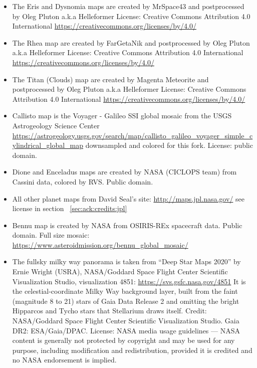 \begin{itemize}
	 Snowfall and postprocessed by Oleg Pluton a.k.a Helleformer
	 License: Creative Commons Attribution 4.0 International \url{https://creativecommons.org/licenses/by/4.0/}
\item The Eris and Dysnomia maps are created by MrSpace43 and postprocessed by 
	 Oleg Pluton a.k.a Helleformer
	 License: Creative Commons Attribution 4.0 International \url{https://creativecommons.org/licenses/by/4.0/}
\item The Rhea map are created by FarGetaNik and postprocessed by Oleg Pluton 
	 a.k.a Helleformer
	 License: Creative Commons Attribution 4.0 International \url{https://creativecommons.org/licenses/by/4.0/}
\item The Titan (Clouds) map are created by Magenta Meteorite and postprocessed
	 by Oleg Pluton a.k.a Helleformer
	 License: Creative Commons Attribution 4.0 International \url{https://creativecommons.org/licenses/by/4.0/}
\item Callisto map is the Voyager - Galileo SSI global mosaic from the USGS
	 Astrogeology Science Center
	 \url{https://astrogeology.usgs.gov/search/map/callisto_galileo_voyager_simple_cylindrical_global_map}
	 downsampled and colored for this fork. License: public domain.
\item Dione and Enceladus maps are created by NASA (CICLOPS team) 
	 from Cassini data, colored by RVS. Public domain.
\item All other planet maps from David Seal's site:
	 \url{http://maps.jpl.nasa.gov/} see license in section ~\ref{sec:ack:credits:jpl}
\item Bennu map is created by NASA from OSIRIS-REx spacecraft data. Public domain.
	 Full size mosaic: \url{https://www.asteroidmission.org/bennu_global_mosaic/}
\item The fullsky milky way panorama is taken from ``Deep Star Maps 2020''
	 by Ernie Wright (USRA), NASA/Goddard Space Flight Center Scientific
	 Visualization Studio, visualization 4851:
	 \url{https://svs.gsfc.nasa.gov/4851}
	 It is the celestial-coordinate Milky Way background layer, built from
	 the faint (magnitude 8 to 21) stars of Gaia Data Release 2 and omitting
	 the bright Hipparcos and Tycho stars that Stellarium draws itself.
	 Credit: NASA/Goddard Space Flight Center Scientific Visualization
	 Studio. Gaia DR2: ESA/Gaia/DPAC.
	 License: NASA media usage guidelines --- NASA content is generally not
	 protected by copyright and may be used for any purpose, including
	 modification and redistribution, provided it is credited and no NASA
	 endorsement is implied.

\end{itemize}
